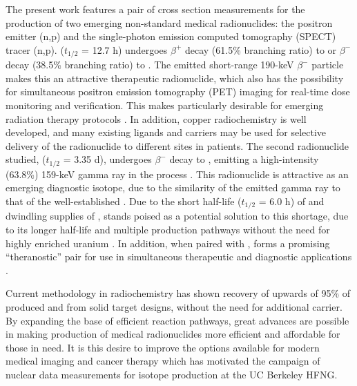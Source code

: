The present work features a pair of cross section measurements for the production of two emerging non-standard medical radionuclides: the positron emitter (n,p) and the single-photon emission computed tomography (SPECT) tracer (n,p).
  ($t_{1/2}$ = 12.7 h) undergoes $\beta^+$ decay (61.5\% branching ratio) to  or $\beta^-$ decay (38.5\% branching ratio) to  \cite{Singh2007}.
The emitted short-range 190-keV $\beta^-$ particle makes this an  attractive  therapeutic radionuclide, which also has the possibility for simultaneous positron emission tomography (PET) imaging for real-time dose monitoring and verification.
This makes  particularly desirable  for emerging radiation therapy protocols \cite{Lewis2003,NSACIsotopesSubcommittee2015,Bandari2014,mp500671j}.
In addition, copper radiochemistry is well developed, and many existing ligands and carriers may be used for selective delivery of the radionuclide to different sites in patients.
The second radionuclide studied,  ($t_{1/2}$ = 3.35 d), undergoes $\beta^-$ decay to , emitting a high-intensity (63.8\%) 159-keV gamma ray in the process \cite{Burrows2007}.
This radionuclide is  attractive as an emerging diagnostic isotope, due to the similarity of the emitted gamma ray to that of the  well-established  \cite{Qaim2011,Qaim201731,Kolsky1998,mausner1995evaluation}.
Due to the short half-life ($t_{1/2}$ = 6.0 h) of and dwindling supplies of ,  stands poised as a potential solution to this shortage, due to its longer half-life and multiple production pathways without the need for highly enriched uranium \cite{Browne2011}.
In addition, when paired with ,  forms a promising \enquote{theranostic} pair for use in simultaneous therapeutic and diagnostic applications \cite{Muller2014,Deilami-nezhad2016}.




Current methodology in radiochemistry has shown recovery of upwards of 95\% of produced  \cite{bhatki1969preparation,mirzadeh1992spontaneous} and  \cite{Aly1971,Bokhari2010,BF02047448} from solid target designs, without the need for additional carrier.
By expanding the base of efficient reaction pathways, great advances are possible in making production of medical radionuclides more efficient and affordable for those in need.  It is this desire to improve the options available for modern medical imaging and cancer therapy which has motivated the campaign of nuclear data measurements for isotope production at the UC Berkeley HFNG.





